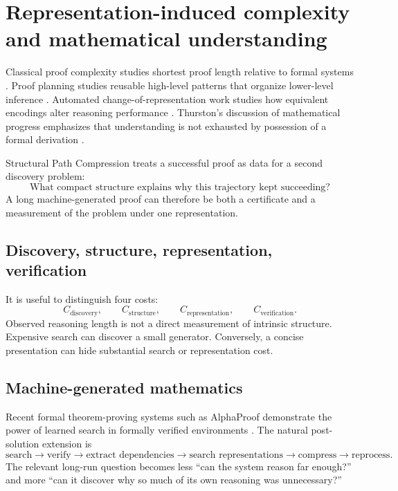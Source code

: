 \documentclass[11pt]{article}
\numberwithin{equation}{section}
\theoremstyle{highend}
\theoremstyle{definition}
\begin{document}
\section{Representation-induced complexity and mathematical understanding}
Classical proof complexity studies shortest proof length relative to formal systems \cite{CookReckhow1979}. Proof planning studies reusable high-level patterns that organize lower-level inference \cite{Bundy1988}. Automated change-of-representation work studies how equivalent encodings alter reasoning performance \cite{Raggi2016,HolteZimmerMacDonald1992}. Thurston's discussion of mathematical progress emphasizes that understanding is not exhausted by possession of a formal derivation \cite{Thurston1994}.

Structural Path Compression treats a successful proof as data for a second discovery problem:
\[
\boxed{\text{What compact structure explains why this trajectory kept succeeding?}}
\]
A long machine-generated proof can therefore be both a certificate and a measurement of the problem under one representation.

\subsection{Discovery, structure, representation, verification}
It is useful to distinguish four costs:
\[
C_{\mathrm{discovery}},\qquad C_{\mathrm{structure}},\qquad C_{\mathrm{representation}},\qquad C_{\mathrm{verification}}.
\]
Observed reasoning length is not a direct measurement of intrinsic structure. Expensive search can discover a small generator. Conversely, a concise presentation can hide substantial search or representation cost.

\subsection{Machine-generated mathematics}
Recent formal theorem-proving systems such as AlphaProof demonstrate the power of learned search in formally verified environments \cite{AlphaProof2025}. The natural post-solution extension is
\[
\text{search}\to\text{verify}\to\text{extract dependencies}\to\text{search representations}\to\text{compress}\to\text{reprocess}.
\]
The relevant long-run question becomes less ``can the system reason far enough?'' and more ``can it discover why so much of its own reasoning was unnecessary?''

\end{document}
